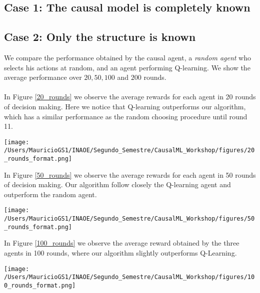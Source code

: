 \documentclass[a0,portrait]{a0poster}
\begin{document}
\begin{multicols}{3}
\subsection{Case 1: The causal model is completely known}


\subsection{Case 2: Only the structure is known}
We compare the performance obtained by the causal agent, a \textit{random agent} who selects his actions at random, and an agent performing Q-learning. We show the average performance over $20, 50, 100$ and $200$ rounds.\\
\\
In Figure \ref{20_rounds} we observe the average rewards for each agent in 20 rounds of decision making. Here we notice that Q-learning outperforms our algorithm, which has a similar performance as the random choosing procedure until round 11.

\begin{center}
\centerline{\texttt{[image: /Users/MauricioGS1/INAOE/Segundo\_Semestre/CausalML\_Workshop/figures/20\_rounds\_format.png]}}
\label{20_rounds}
\end{center}


In Figure \ref{50_rounds} we observe the average rewards for each agent in 50 rounds of decision making. Our algorithm follow closely the Q-learning agent and outperform the random agent.


\begin{center}
\centerline{\texttt{[image: /Users/MauricioGS1/INAOE/Segundo\_Semestre/CausalML\_Workshop/figures/50\_rounds\_format.png]}}
\label{50_rounds}
\end{center}


In Figure \ref{100_rounds} we observe the average reward obtained by the three agents in 100 rounds, where our algorithm slightly outperforms Q-Learning.

\begin{center}
\centerline{\texttt{[image: /Users/MauricioGS1/INAOE/Segundo\_Semestre/CausalML\_Workshop/figures/100\_rounds\_format.png]}}
\label{100_rounds}
\end{center}


\end{multicols}
\end{document}

